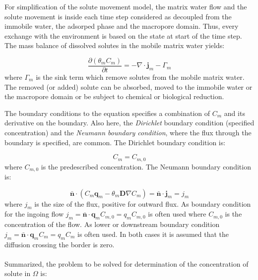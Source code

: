 \documentclass{report}
\begin{document}
For simplification of the solute movement model, the matrix water
flow and the solute movement is inside each time step considered as
decoupled from the immobile water, the adsorped phase and the
macropore domain. Thus, every exchange with the environment is based
on the state at start of the time step. The mass balance of
dissolved solutes in the mobile matrix water yields:

\begin{equation}
\frac{\partial (\theta_{m} C_{m})} {\partial t}
   =-\nabla \cdot \mathbf{j}_{m} - \Gamma_{m}
\label{eq:solmassbal_im}
\end{equation}
%
where $\Gamma_{m}$ is the sink term which remove solutes from the
mobile matrix water. The removed (or added) solute can be absorbed,
moved to the immobile water or the macropore domain or be subject to
chemical or biological reduction.

The boundary conditions to the equation specifies a combination of
$C_{m}$ and its derivative on the boundary. Also here, the
\textit{Dirichlet} boundary condition (specified
concentration) and the \textit{Neumann boundary
  condition}, where the flux through the boundary is
specified, are common. The Dirichlet boundary condition is:

\begin{equation}
C_{m}=C_{m,0} \label{eq:Dirichlet_sol}
\end{equation}
%
where $C_{m,0}$ is the predescribed concentration. The Neumann
boundary condition is:

\begin{equation}
 \mathbf{\bar{n}}\cdot (C_{m}\mathbf{q}_{m}-\theta_{m}\mathbf{D}\nabla
 C_{m})=\mathbf{\bar{n}}\cdot \mathbf{j}_{m}=j_{m}
\label{eq:Neumann_sol}
\end{equation}
%
where $j_{m}$ is the size of the flux, positive for outward flux. As
boundary condition for the ingoing flow
$j_{m}=\mathbf{\bar{n}}\cdot\mathbf{q}_{m}C_{m,0}=q_{m}C_{m,0}$ is
often used where $C_{m,0}$ is the concentration of the flow. As
lower or downstream boundary condition
$j_{m}=\mathbf{\bar{n}}\cdot\mathbf{q}_{m}C_{m}=q_{m}C_{m}$ is often
used. In both cases it is assumed that the diffusion crossing the border is zero.\\
\\
Summarized, the problem to be solved for determination of the
concentration of solute in $\Omega$ is:
\end{document}
